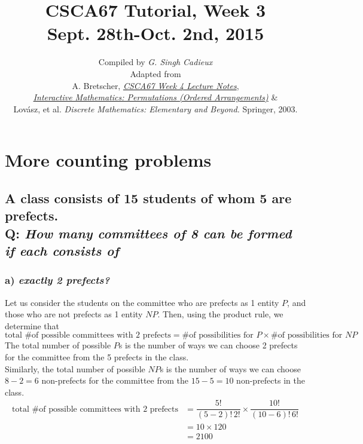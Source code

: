 \documentclass{article}
\title{\sc\LARGE CSCA67 Tutorial, Week 3\\
{\Large Sept. 28th-Oct. 2nd, 2015}}
\date{}
\author{\sc Compiled by {\em G. Singh Cadieux}\\[1ex]
\sc Adapted from\\
A. Bretscher, \href{http://www.utsc.utoronto.ca/~bretscher/a67/lectures/w4.pdf}{\em CSCA67 Week 4 Lecture Notes},\\
\href{http://www.intmath.com/counting-probability/3-permutations.php}{\em Interactive Mathematics: Permutations (Ordered Arrangements)} \&\\
Lov\'{a}sz, et al. \textit{Discrete Mathematics: Elementary and Beyond.} Springer, 2003.}
\begin{document}
\maketitle

\section{\sc More counting problems}

\subsection*{{\normalsize A class consists of 15 students of whom 5 are prefects.}\\
Q: {\em How many committees of 8 can be formed if each consists of}}
\subsubsection*{a) {\em exactly 2 prefects?}}
Let us consider the students on the committee who are prefects as 1 entity $P$, and those who are not prefects as 1 entity $NP$. Then, using the product rule, we determine that
\begin{equation*}
\text{total \# of possible committees with 2 prefects}=\text{\# of possibilities for }P\times \text{\# of possibilities for }NP
\end{equation*}
The total number of possible $P$s is the number of ways we can choose 2 prefects for the committee from the 5 prefects in the class.\\[1ex]
Similarly, the total number of possible $NP$s is the number of ways we can choose $8-2=6$ non-prefects for the committee from the $15-5=10$ non-prefects in the class.
\begin{align*}
\text{total \# of possible committees with 2 prefects}& =\dfrac{5!}{(5-2)!\,2!}\times\dfrac{10!}{(10-6)!\,6!}\\
& =10\times 120\\
& =2100
\end{align*}
\end{document}
